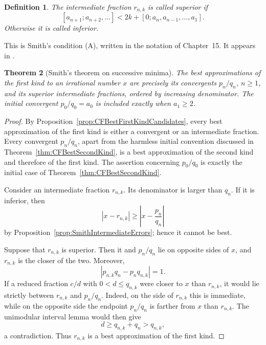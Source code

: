 \documentclass{book}
\newtheorem{definition}{Definition}[section]
\newtheorem{theorem}[definition]{Theorem}
\begin{document}
\begin{definition}
  The intermediate fraction \(r_{n,k}\) is called
  \textnormal{superior} if
  \begin{equation}\label{eq:SmithSuperiorDefinition}
    [a_{n+1};a_{n+2},\ldots]
    <
    2k+[0;a_n,a_{n-1},\ldots,a_1].
  \end{equation}
  Otherwise it is called \textnormal{inferior}.
\end{definition}

This is Smith's condition (A), written in the notation of Chapter~15.
It appears in \cite[Arts.~15--16]{Smith1876}.

\begin{theorem}[Smith's theorem on successive minima]
  \label{thm:SmithSuccessiveMinima}
  The best approximations of the first kind to an irrational number \(x\)
  are precisely its convergents \(p_n/q_n\), \(n\geq1\), and its superior
  intermediate fractions, ordered by increasing denominator. The initial
  convergent \(p_0/q_0=a_0\) is included exactly when \(a_1\geq2\).
\end{theorem}

\begin{proof}
  By Proposition~\ref{prop:CFBestFirstKindCandidates}, every best
  approximation of the first kind is either a convergent or an intermediate
  fraction. Every convergent \(p_n/q_n\), apart from the harmless initial
  convention discussed in Theorem~\ref{thm:CFBestSecondKind}, is a best
  approximation of the second kind and therefore of the first kind. The
  assertion concerning \(p_0/q_0\) is exactly the initial case of
  Theorem~\ref{thm:CFBestSecondKind}.

  Consider an intermediate fraction \(r_{n,k}\). Its denominator is larger
  than \(q_n\). If it is inferior, then
  \[
    \left|x-r_{n,k}\right|
      \geq
    \left|x-\frac{p_n}{q_n}\right|
  \]
  by Proposition~\ref{prop:SmithIntermediateErrors}; hence it cannot be
  best.

  Suppose that \(r_{n,k}\) is superior. Then it and \(p_n/q_n\) lie on
  opposite sides of \(x\), and \(r_{n,k}\) is the closer of the two.
  Moreover,
  \[
    \left|p_{n,k}q_n-p_nq_{n,k}\right|=1.
  \]
  If a reduced fraction \(c/d\) with
  \(0<d\leq q_{n,k}\) were closer to \(x\) than \(r_{n,k}\), it would lie
  strictly between \(r_{n,k}\) and \(p_n/q_n\). Indeed, on the side of
  \(r_{n,k}\) this is immediate, while on the opposite side the endpoint
  \(p_n/q_n\) is farther from \(x\) than \(r_{n,k}\). The unimodular interval
  lemma would then give
  \[
    d\geq q_{n,k}+q_n>q_{n,k},
  \]
  a contradiction. Thus \(r_{n,k}\) is a best approximation of the first
  kind.
\end{proof}
\end{document}
